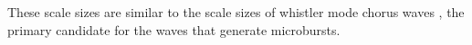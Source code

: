 \documentclass[draft]{agujournal2019}
\begin{document}
These scale sizes are similar to the scale sizes of whistler mode chorus waves \cite{chorus_scales}, the primary candidate for the waves that generate microbursts.





%
%
%
%
%
%
%
%
%
%
\end{document}
